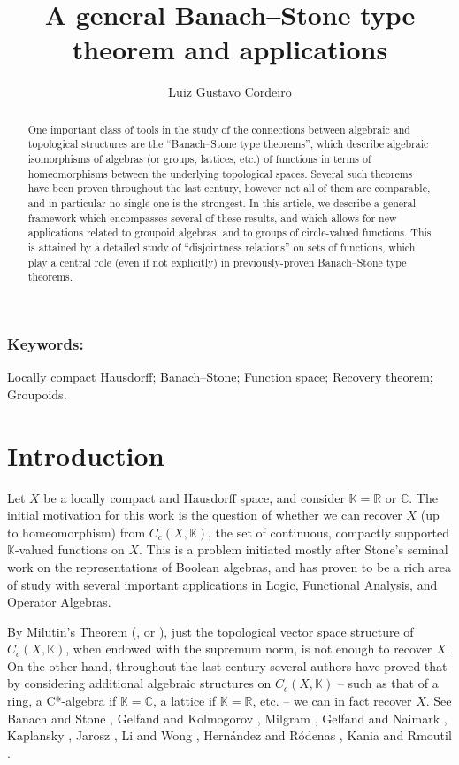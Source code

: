 \documentclass[letter,11pt]{amsart}
\title{A general Banach--Stone type theorem and applications}
\author{Luiz Gustavo Cordeiro}
\theoremstyle{plain}		\newtheorem{theorem}[generalnumbering]{Theorem}
\theoremstyle{plain}		\newtheorem{corollary}[generalnumbering]{Corollary}
\theoremstyle{definition}		\newtheorem{definition}[generalnumbering]{Definition}
\theoremstyle{definition}		\newtheorem{example}[generalnumbering]{Example}
\theoremstyle{plain}		\newtheorem{proposition}[generalnumbering]{Proposition}
\theoremstyle{plain}		\newtheorem{lemma}[generalnumbering]{Lemma}
\theoremstyle{definition}
\begin{document}
\begin{abstract}
	One important class of tools in the study of the connections between algebraic and topological structures are the ``Banach--Stone type theorems'', which describe algebraic isomorphisms of algebras (or groups, lattices, etc.) of functions in terms of homeomorphisms between the underlying topological spaces. Several such theorems have been proven throughout the last century, however not all of them are comparable, and in particular no single one is the strongest. In this article, we describe a general framework which encompasses several of these results, and which allows for new applications related to groupoid algebras, and to groups of circle-valued functions. This is attained by a detailed study of ``disjointness relations'' on sets of functions, which play a central role (even if not explicitly) in previously-proven Banach--Stone type theorems.
\end{abstract}

\maketitle

\subsubsection*{Keywords:} Locally compact Hausdorff; Banach--Stone; Function space; Recovery theorem; Groupoids.

\section*{Introduction}

Let $X$ be a locally compact and Hausdorff space, and consider $\mathbb{K}=\mathbb{R}$ or $\mathbb{C}$. The initial motivation for this work is the question of whether we can recover $X$ (up to homeomorphism) from $C_c(X,\mathbb{K})$, the set of continuous, compactly supported $\mathbb{K}$-valued functions on $X$. This is a problem initiated mostly after Stone's seminal work \cite{MR1501865} on the representations of Boolean algebras, and has proven to be a rich area of study with several important applications in Logic, Functional Analysis, and Operator Algebras.

By Milutin's Theorem (\cite{MR0206695}, or \cite[Chapter 36, Theorem 2.1]{MR1999613}), just the topological vector space structure of $C_c(X,\mathbb{K})$, when endowed with the supremum norm, is not enough to recover $X$. On the other hand, throughout the last century several authors have proved that by considering additional algebraic structures on $C_c(X,\mathbb{K})$ -- such as that of a ring, a C*-algebra if $\mathbb{K}=\mathbb{C}$, a lattice if $\mathbb{K}=\mathbb{R}$, etc. -- we can in fact recover $X$. See Banach and Stone \cite{MR1357166,MR1501905}, Gelfand and Kolmogorov \cite{gelfandkolmogorov1939}, Milgram \cite{MR0029476}, Gelfand and Naimark \cite{MR0009426}, Kaplansky \cite{MR0020715}, Jarosz \cite{MR1060366}, Li and Wong \cite{MR3162258}, Hernández and Ródenas \cite{MR2324919}, Kania and Rmoutil \cite{MR3813611}.
\end{document}
